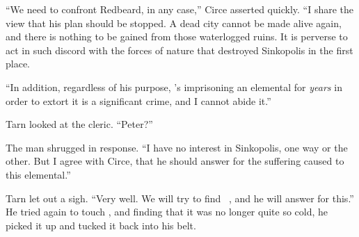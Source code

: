 ``We need to confront \mothzam Redbeard, in any case,'' Circe asserted quickly.  ``I share the view that his plan should be stopped.  A dead city cannot be made alive again, and there is nothing to be gained from those waterlogged ruins.  It is perverse to act in such discord with the forces of nature that destroyed Sinkopolis in the first place.

``In addition, regardless of his purpose, \mothzam's imprisoning an elemental for \emph{years} in order to extort it is a significant crime, and I cannot abide it.''

Tarn looked at the cleric.  ``Peter?''

The man shrugged in response.  ``I have no interest in Sinkopolis, one way or the other.  But I agree with Circe, that he should answer for the suffering caused to this elemental.''

Tarn let out a sigh.  ``Very well.  We will try to find \mothzam\ \driktur, and he will answer for this.''  He tried again to touch \kildir, and finding that it was no longer quite so cold, he picked it up and tucked it back into his belt.

